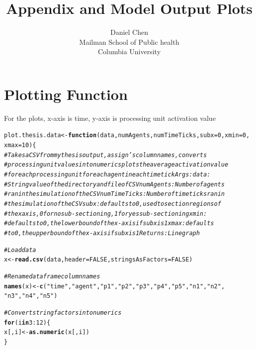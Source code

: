 \documentclass{article}\usepackage[]{graphicx}\usepackage[]{color}
\title{Appendix and Model Output Plots}
\author{Daniel Chen \\ Mailman School of Public health \\ Columbia University}
\date{}
\makeatletter
\newcommand{\hlnum}[1]{\textcolor[rgb]{0.686,0.059,0.569}{#1}}%
\newcommand{\hlstr}[1]{\textcolor[rgb]{0.192,0.494,0.8}{#1}}%
\newcommand{\hlcom}[1]{\textcolor[rgb]{0.678,0.584,0.686}{\textit{#1}}}%
\newcommand{\hlopt}[1]{\textcolor[rgb]{0,0,0}{#1}}%
\newcommand{\hlstd}[1]{\textcolor[rgb]{0.345,0.345,0.345}{#1}}%
\newcommand{\hlkwa}[1]{\textcolor[rgb]{0.161,0.373,0.58}{\textbf{#1}}}%
\newcommand{\hlkwb}[1]{\textcolor[rgb]{0.69,0.353,0.396}{#1}}%
\newcommand{\hlkwc}[1]{\textcolor[rgb]{0.333,0.667,0.333}{#1}}%
\newcommand{\hlkwd}[1]{\textcolor[rgb]{0.737,0.353,0.396}{\textbf{#1}}}%
\newenvironment{kframe}{%
 \def\at@end@of@kframe{}%
 \ifinner\ifhmode%
  \def\at@end@of@kframe{\end{minipage}}%
  \begin{minipage}{\columnwidth}%
 \fi\fi%
 \def\FrameCommand##1{\hskip\@totalleftmargin \hskip-\fboxsep
 \colorbox{shadecolor}{##1}\hskip-\fboxsep
     \hskip-\linewidth \hskip-\@totalleftmargin \hskip\columnwidth}%
 \MakeFramed {\advance\hsize-\width
   \@totalleftmargin\z@ \linewidth\hsize
   \@setminipage}}%
 {\par\unskip\endMakeFramed%
 \at@end@of@kframe}
\newenvironment{knitrout}{}{} %
\makeatother
\begin{document}
\maketitle
\tableofcontents

\newpage

\section{Plotting Function}
\label{sec:plot-function}
For the plots, x-axis is time, y-axis is processing unit activation value

\begin{knitrout}
\color{fgcolor}\begin{kframe}
\begin{alltt}
\hlstd{plot.thesis.data} \hlkwb{<-} \hlkwa{function}\hlstd{(}\hlkwc{data}\hlstd{,} \hlkwc{numAgents}\hlstd{,} \hlkwc{numTimeTicks}\hlstd{,} \hlkwc{subx} \hlstd{=} \hlnum{0}\hlstd{,} \hlkwc{xmin} \hlstd{=} \hlnum{0}\hlstd{,}
    \hlkwc{xmax} \hlstd{=} \hlnum{10}\hlstd{) \{}
    \hlcom{# Takes a CSV from my thesis output, assign's column names, converts}
    \hlcom{# processing unit values into numerics plots the average activation value}
    \hlcom{# for each processing unit for each agent in each time tick Args: data:}
    \hlcom{# String value of the directory and file of CSV numAgents: Number of agents}
    \hlcom{# ran in the simulation of the CSV numTimeTicks: Number of time ticks ran in}
    \hlcom{# the simulation of the CSV subx: defaults to 0, used to section regions of}
    \hlcom{# the x axis, 0 for no sub-sectioning, 1 for yes sub-sectioning xmin:}
    \hlcom{# defaults to 0, the lower bound of the x-axis if subx is 1 xmax: defaults}
    \hlcom{# to 0, the upper bound of the x-axis if subx is 1 Returns: Line graph}

    \hlcom{# Load data}
    \hlstd{x} \hlkwb{<-} \hlkwd{read.csv}\hlstd{(data,} \hlkwc{header} \hlstd{=} \hlnum{FALSE}\hlstd{,} \hlkwc{stringsAsFactors} \hlstd{=} \hlnum{FALSE}\hlstd{)}

    \hlcom{# Rename dataframe column names}
    \hlkwd{names}\hlstd{(x)} \hlkwb{<-} \hlkwd{c}\hlstd{(}\hlstr{"time"}\hlstd{,} \hlstr{"agent"}\hlstd{,} \hlstr{"p1"}\hlstd{,} \hlstr{"p2"}\hlstd{,} \hlstr{"p3"}\hlstd{,} \hlstr{"p4"}\hlstd{,} \hlstr{"p5"}\hlstd{,} \hlstr{"n1"}\hlstd{,} \hlstr{"n2"}\hlstd{,}
        \hlstr{"n3"}\hlstd{,} \hlstr{"n4"}\hlstd{,} \hlstr{"n5"}\hlstd{)}

    \hlcom{# Convert string factors into numerics}
    \hlkwa{for} \hlstd{(i} \hlkwa{in} \hlnum{3}\hlopt{:}\hlnum{12}\hlstd{) \{}
        \hlstd{x[, i]} \hlkwb{<-} \hlkwd{as.numeric}\hlstd{(x[, i])}
    \hlstd{\}}


\end{alltt}
\end{kframe}
\end{knitrout}
\end{document}
